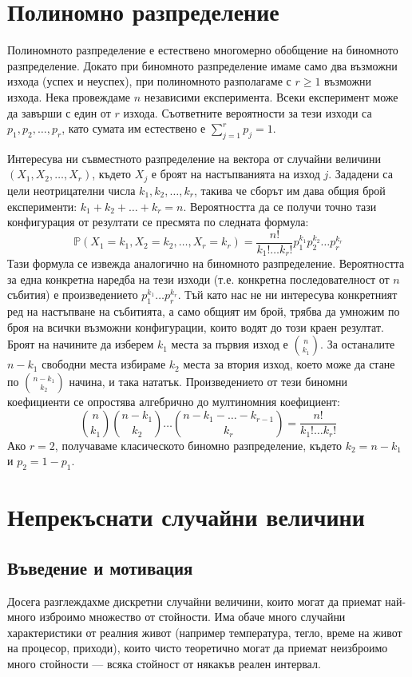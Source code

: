 \documentclass{article}
\begin{document}
\section{Полиномно разпределение}

Полиномното разпределение е естествено многомерно обобщение на биномното разпределение. Докато при биномното разпределение имаме само два възможни изхода (успех и неуспех), при полиномното разполагаме с $r \ge 1$ възможни изхода.
Нека провеждаме $n$ независими експеримента. Всеки експеримент може да завърши с един от $r$ изхода. Съответните вероятности за тези изходи са $p_1, p_2, \dots, p_r$, като сумата им естествено е $\sum_{j=1}^{r} p_j = 1$.

Интересува ни съвместното разпределение на вектора от случайни величини $(X_1, X_2, \dots, X_r)$, където $X_j$ е броят на настъпванията на изход $j$. Зададени са цели неотрицателни числа $k_1, k_2, \dots, k_r$, такива че сборът им дава общия брой експерименти: $k_1 + k_2 + \dots + k_r = n$.
Вероятността да се получи точно тази конфигурация от резултати се пресмята по следната формула:
\[
\mathbb{P}(X_1=k_1, X_2=k_2, \dots, X_r=k_r) = \frac{n!}{k_1! \dots k_r!} p_1^{k_1} p_2^{k_2} \dots p_r^{k_r}
\]
Тази формула се извежда аналогично на биномното разпределение. Вероятността за една конкретна наредба на тези изходи (т.е. конкретна последователност от $n$ събития) е произведението $p_1^{k_1} \dots p_r^{k_r}$. Тъй като нас не ни интересува конкретният ред на настъпване на събитията, а само общият им брой, трябва да умножим по броя на всички възможни конфигурации, които водят до този краен резултат.
Броят на начините да изберем $k_1$ места за първия изход е $\binom{n}{k_1}$. За останалите $n-k_1$ свободни места избираме $k_2$ места за втория изход, което може да стане по $\binom{n-k_1}{k_2}$ начина, и така нататък. Произведението от тези биномни коефициенти се опростява алгебрично до мултиномния коефициент:
\[
\binom{n}{k_1} \binom{n-k_1}{k_2} \dots \binom{n-k_1-\dots-k_{r-1}}{k_r} = \frac{n!}{k_1! \dots k_r!}
\]
Ако $r=2$, получаваме класическото биномно разпределение, където $k_2 = n - k_1$ и $p_2 = 1 - p_1$.

\section{Непрекъснати случайни величини}

\subsection{Въведение и мотивация}
Досега разглеждахме дискретни случайни величини, които могат да приемат най-много изброимо множество от стойности. Има обаче много случайни характеристики от реалния живот (например температура, тегло, време на живот на процесор, приходи), които чисто теоретично могат да приемат неизброимо много стойности — всяка стойност от някакъв реален интервал.
\end{document}
